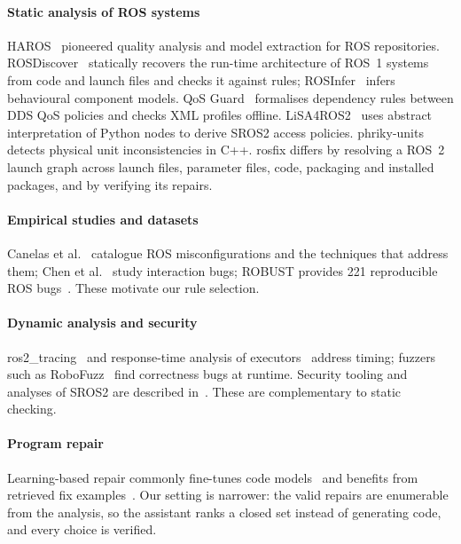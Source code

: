 ﻿\documentclass[conference]{IEEEtran}
\newcommand{\tool}{\textsf{rosfix}}
\begin{document}
\paragraph{Static analysis of ROS systems}
HAROS~\cite{santos2016haros,santos2021haros} pioneered quality analysis and model extraction for
ROS repositories. ROSDiscover~\cite{timperley2022rosdiscover} statically recovers the run-time
architecture of ROS~1 systems from code and launch files and checks it against rules;
ROSInfer~\cite{durschmid2024rosinfer} infers behavioural component models. QoS
Guard~\cite{lee2025qosguard} formalises dependency rules between DDS QoS policies and checks
XML profiles offline. LiSA4ROS2~\cite{zanatta2024lisa} uses abstract interpretation of Python
nodes to derive SROS2 access policies. phriky-units~\cite{ore2017phriky} detects physical
unit inconsistencies in C++. \tool{} differs by resolving a ROS~2 launch graph across launch
files, parameter files, code, packaging and installed packages, and by verifying its repairs.

\paragraph{Empirical studies and datasets}
Canelas et al.~\cite{canelas2024misconfig} catalogue ROS misconfigurations and the techniques
that address them; Chen et al.~\cite{chen2025ibugs} study interaction bugs; ROBUST provides 221
reproducible ROS bugs~\cite{timperley2024robust}. These motivate our rule selection.

\paragraph{Dynamic analysis and security}
ros2\_tracing~\cite{bedard2022tracing} and response-time analysis of
executors~\cite{casini2019rta} address timing; fuzzers such as RoboFuzz~\cite{kim2022robofuzz}
find correctness bugs at runtime. Security tooling and analyses of SROS2 are described
in~\cite{mayoral2022sros2,deng2022secureros2}. These are complementary to static checking.

\paragraph{Program repair}
Learning-based repair commonly fine-tunes code models~\cite{silva2023repairllama} and benefits
from retrieved fix examples~\cite{wang2023rapgen}. Our setting is narrower: the valid repairs
are enumerable from the analysis, so the assistant ranks a closed set instead of generating
code, and every choice is verified.
\end{document}
